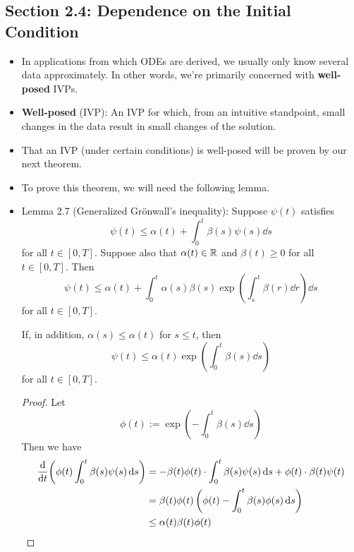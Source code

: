 \documentclass[../notes.tex]{subfiles}
\begin{document}
\subsection*{Section 2.4: Dependence on the Initial Condition}
\begin{itemize}
    \item {}In applications from which ODEs are derived, we usually only know several data approximately. In other words, we're primarily concerned with \textbf{well-posed} IVPs.
    \item \textbf{Well-posed} (IVP): An IVP for which, from an intuitive standpoint, small changes in the data result in small changes of the solution.
    \item That an IVP (under certain conditions) is well-posed will be proven by our next theorem.
    \item To prove this theorem, we will need the following lemma.
    \item Lemma 2.7 (Generalized Gr\"{o}nwall's inequality): Suppose $\psi(t)$ satisfies
    \begin{equation*}
        \psi(t) \leq \alpha(t)+\int_0^t\beta(s)\psi(s)\dd{s}
    \end{equation*}
    for all $t\in[0,T]$. Suppose also that $\alpha(t)\in\mathbb{R}$ and $\beta(t)\geq 0$ for all $t\in[0,T]$. Then
    \begin{equation*}
        \psi(t) \leq \alpha(t)+\int_0^t\alpha(s)\beta(s)\exp(\int_s^t\beta(r)\dd{r})\dd{s}
    \end{equation*}
    for all $t\in[0,T]$.\par
    If, in addition, $\alpha(s)\leq\alpha(t)$ for $s\leq t$, then
    \begin{equation*}
        \psi(t) \leq \alpha(t)\exp(\int_0^t\beta(s)\dd{s})
    \end{equation*}
    for all $t\in[0,T]$.
    \begin{proof}
        Let
        \begin{equation*}
            \phi(t) := \exp(-\int_0^t\beta(s)\dd{s})
        \end{equation*}
        Then we have
        \begin{align*}
            \dv{t}(\phi(t)\int_0^t\beta(s)\psi(s)\dd{s}) &= -\beta(t)\phi(t)\cdot\int_0^t\beta(s)\psi(s)\dd{s}+\phi(t)\cdot\beta(t)\psi(t)\\
            &= \beta(t)\phi(t)\left( \phi(t)-\int_0^t\beta(s)\phi(s)\dd{s} \right)\\
            &\leq \alpha(t)\beta(t)\phi(t)

\end{align*}
\end{proof}
\end{itemize}
\end{document}
